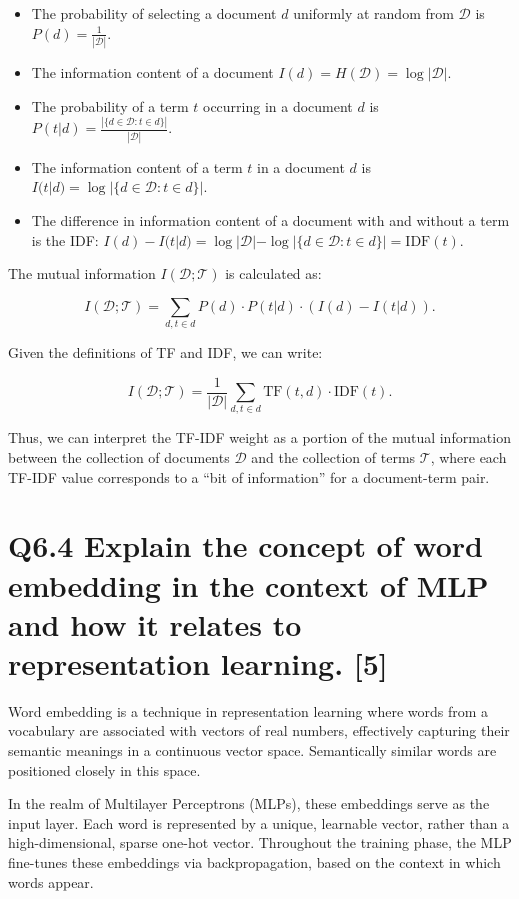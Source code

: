 \documentclass[11pt]{article}
\begin{document}
\begin{itemize}
  \item The probability of selecting a document $d$ uniformly at random from $\mathcal{D}$ is $P(d) = \frac{1}{|\mathcal{D}|}$.
  \item The information content of a document $I(d) = H(\mathcal{D}) = \log |\mathcal{D}|$.
  \item The probability of a term $t$ occurring in a document $d$ is $P(t|d) = \frac{|\{d \in \mathcal{D} : t \in d\}|}{|\mathcal{D}|}$.
  \item The information content of a term $t$ in a document $d$ is $I(t|d) = \log |\{d \in \mathcal{D} : t \in d\}|$.
  \item The difference in information content of a document with and without a term is the IDF: $I(d) - I(t|d) = \log |\mathcal{D}| - \log |\{d \in \mathcal{D} : t \in d\}| = \text{IDF}(t)$.
\end{itemize}

The mutual information $I(\mathcal{D}; \mathcal{T})$ is calculated as:

\[
I(\mathcal{D}; \mathcal{T}) = \sum_{d, t \in d} P(d) \cdot P(t|d) \cdot (I(d) - I(t|d)).
\]

Given the definitions of TF and IDF, we can write:

\[
I(\mathcal{D}; \mathcal{T}) = \frac{1}{|\mathcal{D}|} \sum_{d, t \in d} \text{TF}(t, d) \cdot \text{IDF}(t).
\]

Thus, we can interpret the TF-IDF weight as a portion of the mutual information between the collection of documents $\mathcal{D}$ and the collection of terms $\mathcal{T}$, where each TF-IDF value corresponds to a “bit of information” for a document-term pair.

\section{Q6.4 Explain the concept of word embedding in the context of MLP and how it relates to representation learning. [5]}

Word embedding is a technique in representation learning where words from a vocabulary are associated with vectors of real numbers, effectively capturing their semantic meanings in a continuous vector space. Semantically similar words are positioned closely in this space. 

In the realm of Multilayer Perceptrons (MLPs), these embeddings serve as the input layer. Each word is represented by a unique, learnable vector, rather than a high-dimensional, sparse one-hot vector. Throughout the training phase, the MLP fine-tunes these embeddings via backpropagation, based on the context in which words appear.
\end{document}
